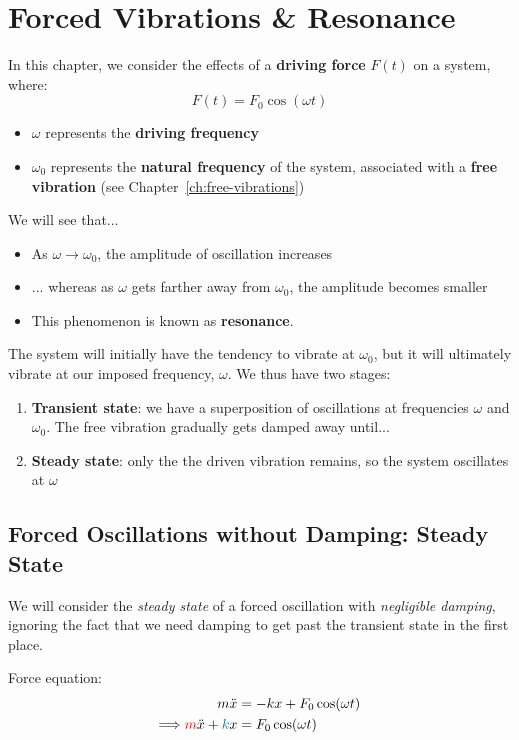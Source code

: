 \chapter{Forced Vibrations \& Resonance}


	In this chapter, we consider the effects of a \textbf{driving force} $F(t)$ on a system, where:
	\[ {F(t) = F_0 \cos(\omega t)} \]
	\begin{itemize}
		\item $\omega$ represents the \textbf{driving frequency}
		\item $\omega_0$ represents the \textbf{natural frequency} of the system, associated with a \textbf{free vibration} (see Chapter~\ref{ch:free-vibrations})
	\end{itemize}



We will see that...
\begin{itemize}
	\item As $\omega \to \omega_0$, the amplitude of oscillation increases
	\item ... whereas as $\omega$ gets farther away from $\omega_0$, the amplitude becomes smaller
	\item This phenomenon is known as \textbf{resonance}.
\end{itemize}

The system will initially have the tendency to vibrate at $\omega_0$, but it will ultimately vibrate at our imposed frequency, $\omega$. We thus have two stages:
\begin{enumerate}
	\item \textbf{Transient state}: we have a superposition of oscillations at frequencies $\omega$ and $\omega_0$. The free vibration gradually gets damped away until...
	\item \textbf{Steady state}: only the the driven vibration remains, so the system oscillates at $\omega$
\end{enumerate}

\section{Forced Oscillations without Damping: Steady State}	\label{ch4:sec:no-damping-steady}
We will consider the \emph{steady state} of a forced oscillation with \emph{negligible damping}, ignoring the fact that we need damping to get past the transient state in the first place.

Force equation:
\begin{align}
	m\ddot{x} &= -kx + F_0 \cos(\omega t)  \notag \\
	\Longrightarrow
	\textcolor{red}{m}\ddot{x} + \textcolor{teal}{k}x &= F_0 \cos(\omega t)	\label{ch4:eq-no-b}
\end{align}

